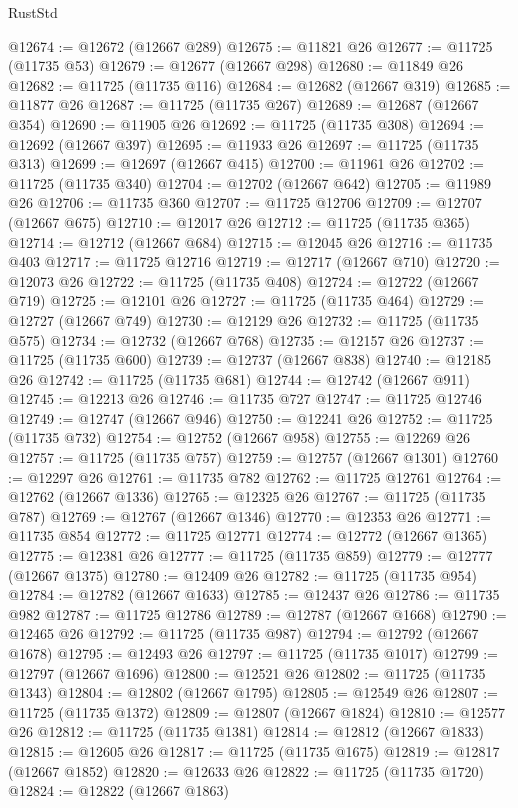 \begin{lexlean}{RustStd}
\begin{coremodule}
@12674 := @12672 (@12667 @289)
@12675 := @11821 @26
@12677 := @11725 (@11735 @53)
@12679 := @12677 (@12667 @298)
@12680 := @11849 @26
@12682 := @11725 (@11735 @116)
@12684 := @12682 (@12667 @319)
@12685 := @11877 @26
@12687 := @11725 (@11735 @267)
@12689 := @12687 (@12667 @354)
@12690 := @11905 @26
@12692 := @11725 (@11735 @308)
@12694 := @12692 (@12667 @397)
@12695 := @11933 @26
@12697 := @11725 (@11735 @313)
@12699 := @12697 (@12667 @415)
@12700 := @11961 @26
@12702 := @11725 (@11735 @340)
@12704 := @12702 (@12667 @642)
@12705 := @11989 @26
@12706 := @11735 @360
@12707 := @11725 @12706
@12709 := @12707 (@12667 @675)
@12710 := @12017 @26
@12712 := @11725 (@11735 @365)
@12714 := @12712 (@12667 @684)
@12715 := @12045 @26
@12716 := @11735 @403
@12717 := @11725 @12716
@12719 := @12717 (@12667 @710)
@12720 := @12073 @26
@12722 := @11725 (@11735 @408)
@12724 := @12722 (@12667 @719)
@12725 := @12101 @26
@12727 := @11725 (@11735 @464)
@12729 := @12727 (@12667 @749)
@12730 := @12129 @26
@12732 := @11725 (@11735 @575)
@12734 := @12732 (@12667 @768)
@12735 := @12157 @26
@12737 := @11725 (@11735 @600)
@12739 := @12737 (@12667 @838)
@12740 := @12185 @26
@12742 := @11725 (@11735 @681)
@12744 := @12742 (@12667 @911)
@12745 := @12213 @26
@12746 := @11735 @727
@12747 := @11725 @12746
@12749 := @12747 (@12667 @946)
@12750 := @12241 @26
@12752 := @11725 (@11735 @732)
@12754 := @12752 (@12667 @958)
@12755 := @12269 @26
@12757 := @11725 (@11735 @757)
@12759 := @12757 (@12667 @1301)
@12760 := @12297 @26
@12761 := @11735 @782
@12762 := @11725 @12761
@12764 := @12762 (@12667 @1336)
@12765 := @12325 @26
@12767 := @11725 (@11735 @787)
@12769 := @12767 (@12667 @1346)
@12770 := @12353 @26
@12771 := @11735 @854
@12772 := @11725 @12771
@12774 := @12772 (@12667 @1365)
@12775 := @12381 @26
@12777 := @11725 (@11735 @859)
@12779 := @12777 (@12667 @1375)
@12780 := @12409 @26
@12782 := @11725 (@11735 @954)
@12784 := @12782 (@12667 @1633)
@12785 := @12437 @26
@12786 := @11735 @982
@12787 := @11725 @12786
@12789 := @12787 (@12667 @1668)
@12790 := @12465 @26
@12792 := @11725 (@11735 @987)
@12794 := @12792 (@12667 @1678)
@12795 := @12493 @26
@12797 := @11725 (@11735 @1017)
@12799 := @12797 (@12667 @1696)
@12800 := @12521 @26
@12802 := @11725 (@11735 @1343)
@12804 := @12802 (@12667 @1795)
@12805 := @12549 @26
@12807 := @11725 (@11735 @1372)
@12809 := @12807 (@12667 @1824)
@12810 := @12577 @26
@12812 := @11725 (@11735 @1381)
@12814 := @12812 (@12667 @1833)
@12815 := @12605 @26
@12817 := @11725 (@11735 @1675)
@12819 := @12817 (@12667 @1852)
@12820 := @12633 @26
@12822 := @11725 (@11735 @1720)
@12824 := @12822 (@12667 @1863)

\end{coremodule}
\end{lexlean}
